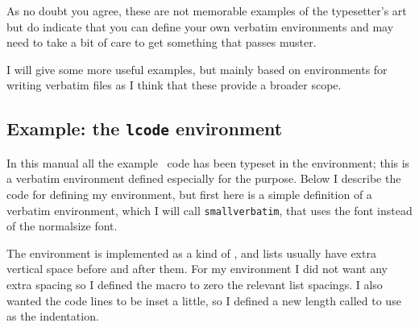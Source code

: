 {{{{\vspace{0.5\onelineskip}
\vspace{0.5\onelineskip}

    As no doubt you agree, these are not memorable examples of
the typesetter's art but do indicate that you can define your own
verbatim environments and may need to take a bit of care to get something
that passes muster.

    I will give some more useful examples, but mainly based on environments
for writing verbatim files as I think that these provide a broader
scope. 


\subsection{Example: the \texttt{lcode} environment}

    In this manual all the example \ltx\ code has been typeset in
the  environment; this is a verbatim environment defined
especially for the purpose. Below I describe the
code for defining my  environment, but first here 
is a simple definition of a verbatim environment, which I will 
call \texttt{smallverbatim},
that uses the \cmd{\small} font instead of the 
normalsize font.
\begin{lcode}
\newenvironment{smallverbatim}%
  {\setverbatimfont{\normalfont\ttfamily\small}%
   \verbatim}%
  {\endverbatim}
\end{lcode}

    The  environment is implemented as a kind of ,
and lists usually have extra vertical space before and after them. For
my environment I did not want any extra spacing 
so I defined the
macro \cmd{\@zeroseps} to zero the relevant list spacings. I also wanted
the code lines to be inset a little, so I defined a new length
called \lnc{\gparindent} to use as the indentation.
\begin{lcode}
\makeatletter
\newcommand{\@zeroseps}{\setlength{\topsep}{\z@}%
                        \setlength{\partopsep}{\z@}%
                        \setlength{\parskip}{\z@}}
\newlength{\gparindent} \setlength{\gparindent}{\parindent}
\setlength{\gparindent}{0.5\parindent}
\newenvironment{lcode}{\@zeroseps
  \renewcommand{\verbatim@startline}{%
                \verbatim@line{\hskip\gparindent}}
  \small\setlength{\baselineskip}{\onelineskip}\verbatim}%
  {\endverbatim
   \vspace{-\baselineskip}%
  \noindent
 }
\makeatother
\end{lcode}

}}}}
